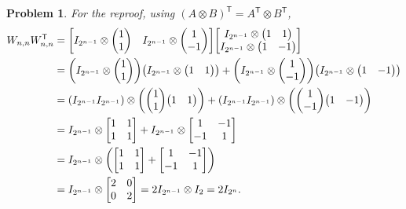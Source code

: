 \documentclass{article}
\newcommand{\T}{\mathsf{T}}
\theoremstyle{pprop}
\newtheorem{problem}{Problem}[section]
\begin{document}
\begin{problem}
For the reproof, using $(A \otimes B)^\T=A^\T \otimes B^\T$, 
\begin{align*}
W_{n,n}W_{n,n}^\T  & =
\mqty[I_{2^{n-1}}\otimes \mqty(1 \\ 1) & I_{2^{n-1}}\otimes \mqty(1 \\ -1)]
\mqty[I_{2^{n-1}}\otimes \mqty(1 & 1) \\ I_{2^{n-1}}\otimes \mqty(1 & -1)]      \\
& = \qty(I_{2^{n-1}}\otimes \mqty(1 \\ 1))\qty(I_{2^{n-1}}\otimes \mqty(1 & 1))
+ \qty(I_{2^{n-1}}\otimes \mqty(1 \\ -1))\qty(I_{2^{n-1}}\otimes \mqty(1 & -1))  \\
& = \qty(I_{2^{n-1}} I_{2^{n-1}})\otimes \qty(\mqty(1 \\ 1)\mqty(1 & 1))
+ \qty(I_{2^{n-1}} I_{2^{n-1}})\otimes \qty(\mqty(1 \\ -1)\mqty(1 & -1)) \\
& = I_{2^{n-1}} \otimes \mqty[1 & 1 \\ 1 & 1]  + I_{2^{n-1}} \otimes \mqty[1 & -1 \\ -1 & 1] \\
& = I_{2^{n-1}} \otimes \qty(\mqty[1 & 1 \\ 1 & 1]+\mqty[1 & -1 \\ -1 & 1]) \\
& = I_{2^{n-1}} \otimes \mqty[2 & 0 \\ 0 & 2] = 2 I_{2^{n-1}} \otimes I_2 = 2 I_{2^n}. 
\end{align*}


\end{problem}
\end{document}
